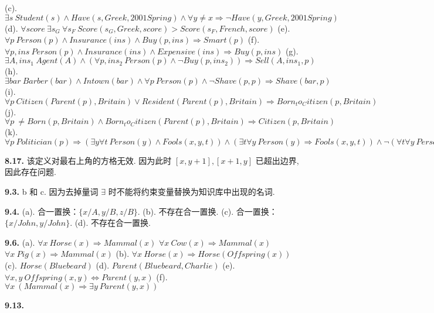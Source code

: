 \documentclass[UTF8]{ctexart}
\begin{document}
    (c). $\exists s\ Student(s) \wedge Have(s, Greek, 2001 Spring) \wedge \forall y \neq x \Rightarrow \neg Have(y, Greek, 2001 Spring)$\newline
    (d). $\forall score\ \exists s_G\ \forall s_F\ Score(s_G, Greek, score) > Score(s_F, French, score)$\newline
    (e). $\forall p\ Person(p) \wedge Insurance(ins) \wedge Buy(p, ins) \Rightarrow Smart(p)$\newline
    (f). $\forall p, ins\ Person(p) \wedge Insurance(ins) \wedge Expensive(ins) \Rightarrow Buy(p, ins)$\newline
    (g). $\exists A, ins_1\ Agent(A) \wedge (\forall p, ins_2\ Person(p) \wedge \neg Buy(p, ins_2)) \Rightarrow Sell(A, ins_1, p)$\newline
    (h). $\exists bar\ Barber(bar) \wedge Intown(bar) \wedge \forall p\ Person(p) \wedge \neg Shave(p, p) \Rightarrow Shave(bar, p)$\newline
    (i). $\forall p\ Citizen(Parent(p), Britain) \vee Resident(Parent(p), Britain) \Rightarrow Born_to_Citizen(p, Britain)$\newline
    (j). $\forall p\ \neq Born(p, Britain) \wedge Born_to_Citizen(Parent(p), Britain) \Rightarrow Citizen(p, Britain)$\newline
    (k). $\forall p\ Politician(p) \Rightarrow (\exists y\forall t\ Person(y) \wedge Fools(x, y, t)) \wedge (\exists t \forall y\ Person(y) \Rightarrow Fools(x, y, t)) \wedge \neg(\forall t\forall y\ Person(y) \Rightarrow Fools(x, y, t))$

    \textnormal{\textbf{8.17.}}\newline
    该定义对最右上角的方格无效. 因为此时 $[x, y + 1], [x + 1, y]$ 已超出边界, 因此存在问题.

    \textnormal{\textbf{9.3.}}\newline
    b 和 c. 因为去掉量词 $\exists$ 时不能将约束变量替换为知识库中出现的名词.

    \textnormal{\textbf{9.4.}}\newline
    (a). 合一置换：$\{x/A, y/B, z/B\}$.\newline
    (b). 不存在合一置换.\newline
    (c). 合一置换：$\{x/John, y/John\}$.\newline
    (d). 不存在合一置换.

    \textnormal{\textbf{9.6.}}
    (a). $\forall x\ Horse(x) \Rightarrow Mammal(x)$\newline
    $\forall x\ Cow(x) \Rightarrow Mammal(x)$\newline
    $\forall x\ Pig(x) \Rightarrow Mammal(x)$\newline
    (b). $\forall x\ Horse(x) \Rightarrow Horse(Offspring(x))$\newline
    (c). $Horse(Bluebeard)$\newline
    (d). $Parent(Bluebeard, Charlie)$\newline
    (e). $\forall x, y\ Offspring(x, y) \Leftrightarrow Parent(y, x)$\newline
    (f). $\forall x\ (Mammal(x) \Rightarrow \exists y\ Parent(y, x))$

    \textnormal{\textbf{9.13.}}
\end{document}
